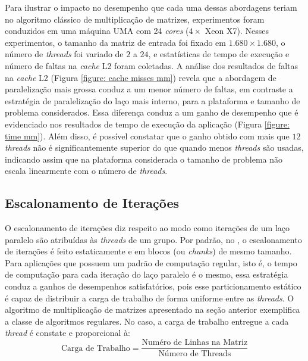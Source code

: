 \documentclass{SBCbookchapter}
\begin{document}
		Para ilustrar o impacto no desempenho que cada uma dessas abordagens
		teriam no algoritmo clássico de multiplicação de matrizes,
		experimentos foram conduzidos em uma máquina UMA com 24 \textit{cores} ($4
		\times$ Xeon X7). Nesses experimentos, o tamanho da matriz de
		entrada foi fixado em $1.680 \times 1.680$, o número de
		\textit{threads} foi variado de $2$ a $24$, e estatísticas de tempo
		de execução e número de faltas na \textit{cache} L2 foram coletadas.
		A análise dos resultados de faltas na \textit{cache} L2 (Figura
		\ref{figure: cache misses mm}) revela que a abordagem de
		paralelização mais grossa conduz a um menor número de faltas, em
		contraste a estratégia de paralelização do laço mais interno, para a
		plataforma e tamanho de problema considerados. Essa diferença conduz
		a um ganho de desempenho que é evidenciado nos resultados de tempo
		de execução da aplicação (Figura \ref{figure: time mm}). Além disso,
		é possível constatar que o ganho obtido com mais que $12$
		\textit{threads} não é significantemente superior do que quando
		menos \textit{threads} são usadas, indicando assim que na
		plataforma considerada o tamanho de problema não escala linearmente
		com o número de \textit{threads}.

	\subsection{Escalonamento de Iterações}
	\label{subsection: escalonamento de iteracoes}

		O escalonamento de iterações diz respeito ao modo como iterações de
		um laço paralelo são atribuídas às \textit{threads} de um grupo. Por padrão,
		no \openmp, o escalonamento de iterações é feito estaticamente e em
		blocos (ou \textit{chunks}) de mesmo tamanho. Para aplicações que
		possuem um padrão de computação regular, isto é, o tempo de
		computação para cada iteração do laço paralelo é o mesmo, essa
		estratégia conduz a ganhos de desempenhos satisfatórios, pois esse
		particionamento estático é capaz de distribuir a carga de trabalho
		de forma uniforme entre as \textit{threads}. O algoritmo de multiplicação de
		matrizes apresentado na seção anterior exemplifica a classe de
		algoritmos regulares. No caso, a carga de trabalho entregue a cada
		\textit{thread} é constate e proporcional à:
		\begin{equation}
			\text{Carga de Trabalho} = \dfrac{\text{Numéro de Linhas na Matriz}}%
			                                 {\text{Número de Threads}}
		\end{equation}
\end{document}
